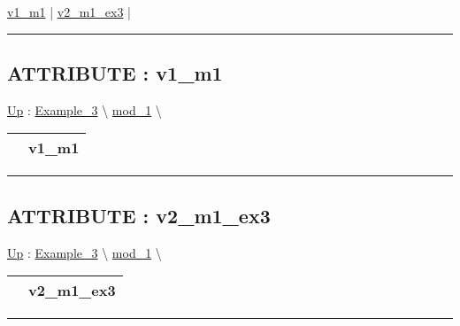 \hyperlink{ecldoc:intest.in1intest.example_3.mod_1.v1_m1}{v1\_m1}  |
\hyperlink{ecldoc:intest.in1intest.example_3.mod_1.v2_m1_ex3}{v2\_m1\_ex3}  |

\rule{\linewidth}{0.5pt}

\subsection*{ATTRIBUTE : v1\_m1}
\hypertarget{ecldoc:intest.in1intest.example_3.mod_1.v1_m1}{}
\hyperlink{ecldoc:intest.in1intest.Example_3.mod_1}{Up} :
\hspace{0pt} \hyperlink{ecldoc:intest.in1intest.Example_3}{Example_3} \textbackslash 
\hspace{0pt} \hyperlink{ecldoc:intest.in1intest.Example_3.mod_1}{mod_1} \textbackslash 

{\renewcommand{\arraystretch}{1.5}
\begin{tabularx}{\textwidth}{|>{\raggedright\arraybackslash}l|X|}
\hline
\hspace{0pt} & v1\_m1 \\
\hline
\end{tabularx}
}

\par


\rule{\linewidth}{0.5pt}
\subsection*{ATTRIBUTE : v2\_m1\_ex3}
\hypertarget{ecldoc:intest.in1intest.example_3.mod_1.v2_m1_ex3}{}
\hyperlink{ecldoc:intest.in1intest.Example_3.mod_1}{Up} :
\hspace{0pt} \hyperlink{ecldoc:intest.in1intest.Example_3}{Example_3} \textbackslash 
\hspace{0pt} \hyperlink{ecldoc:intest.in1intest.Example_3.mod_1}{mod_1} \textbackslash 

{\renewcommand{\arraystretch}{1.5}
\begin{tabularx}{\textwidth}{|>{\raggedright\arraybackslash}l|X|}
\hline
\hspace{0pt} & v2\_m1\_ex3 \\
\hline
\end{tabularx}
}

\par


\rule{\linewidth}{0.5pt}




